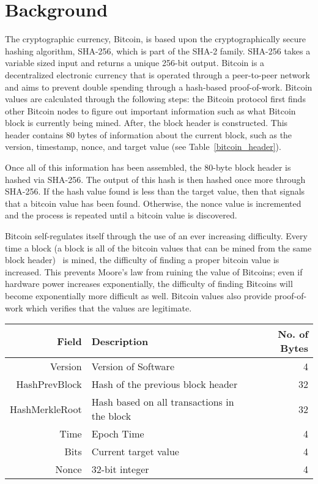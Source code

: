 \section{Background}
\label{background}

The cryptographic currency, Bitcoin, is based upon the cryptographically secure hashing algorithm, SHA-256, which is part of the SHA-2 family.
SHA-256 takes a variable sized input and returns a unique 256-bit output.
Bitcoin is a decentralized electronic currency that is operated through a peer-to-peer network and aims to prevent double spending through a hash-based proof-of-work.
Bitcoin values are calculated through the following steps: the Bitcoin protocol first finds other Bitcoin nodes to figure out important information such as what Bitcoin block is currently being mined.
After, the block header is constructed.
This header contains 80 bytes of information about the current block, such as the version, timestamp, nonce, and target value (see Table~\ref{bitcoin_header}).

Once all of this information has been assembled, the 80-byte block header is hashed via SHA-256.
The output of this hash is then hashed once more through SHA-256.
If the hash value found is less than the target value, then that signals that a bitcoin value has been found.
Otherwise, the nonce value is incremented and the process is repeated until a bitcoin value is discovered.

Bitcoin self-regulates itself through the use of an ever increasing difficulty.
Every time a block (a block is all of the bitcoin values that can be mined from the same block header)  is mined, the difficulty of finding a proper bitcoin value is increased.
This prevents Moore’s law from ruining the value of Bitcoins; even if hardware power increases exponentially, the difficulty of finding Bitcoins will become exponentially more difficult as well.
Bitcoin values also provide proof-of-work which verifies that the values are legitimate.

\begin{table*}
    \centering
\label{bitcoin_header}
\begin{tabular}{r| p{9cm} | r}
  \hline
  \hline
  {\bf Field} & {\bf Description} & {\bf No. of Bytes} \\
  \hline
  Version & Version of Software & 4 \\
  HashPrevBlock & Hash of the previous block header & 32 \\
  HashMerkleRoot & Hash based on all transactions in the block & 32 \\
  Time & Epoch Time & 4 \\
  Bits & Current target value & 4 \\
  Nonce & 32-bit integer & 4 \\
  \hline
\end{tabular}
\caption{The block header for a Bitcoin. These blocks are hashed twice using SHA-256 to determine whether or not the header (with a given nonce) represents a valid Bitcoin. Because the required value becomes harder and harder to match, more and more computation is required to mine additional Bitcoins.}
\end{table*}

